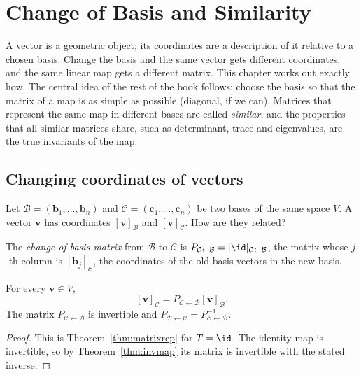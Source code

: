 \chapter{Change of Basis and Similarity}

A vector is a geometric object; its coordinates are a description of it relative to a chosen basis. Change the basis and the same vector gets different coordinates, and the same linear map gets a different matrix. This chapter works out exactly how. The central idea of the rest of the book follows: choose the basis so that the matrix of a map is as simple as possible (diagonal, if we can). Matrices that represent the same map in different bases are called \emph{similar}, and the properties that all similar matrices share, such as determinant, trace and eigenvalues, are the true invariants of the map.

\section{Changing coordinates of vectors}

Let $\mathcal{B}=(\mathbf{b}_1,\dots,\mathbf{b}_n)$ and $\mathcal{C}=(\mathbf{c}_1,\dots,\mathbf{c}_n)$ be two bases of the same space $V$. A vector $\mathbf{v}$ has coordinates $[\mathbf{v}]_{\mathcal{B}}$ and $[\mathbf{v}]_{\mathcal{C}}$. How are they related?

\begin{definition}
The \emph{change-of-basis matrix} from $\mathcal{B}$ to $\mathcal{C}$ is $P_{\mathcal{C}\leftarrow\mathcal{B}}=[\id]_{\mathcal{C}\leftarrow\mathcal{B}}$, the matrix whose $j$-th column is $[\mathbf{b}_j]_{\mathcal{C}}$, the coordinates of the old basis vectors in the new basis.
\end{definition}

\begin{theorem}\label{thm:coordchange}
For every $\mathbf{v}\in V$,
\[ [\mathbf{v}]_{\mathcal{C}}=P_{\mathcal{C}\leftarrow\mathcal{B}}[\mathbf{v}]_{\mathcal{B}}. \]
The matrix $P_{\mathcal{C}\leftarrow\mathcal{B}}$ is invertible and $P_{\mathcal{B}\leftarrow\mathcal{C}}=P_{\mathcal{C}\leftarrow\mathcal{B}}^{-1}$.
\end{theorem}

\begin{proof}
This is Theorem~\ref{thm:matrixrep} for $T=\id$. The identity map is invertible, so by Theorem~\ref{thm:invmap} its matrix is invertible with the stated inverse.
\end{proof}


